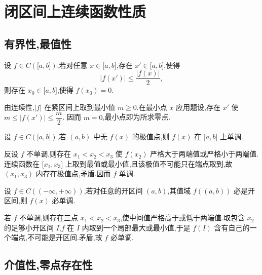 \newpage

\section{闭区间上连续函数性质}


\subsection{有界性,最值性}

\begin{example}
    设 $f\in C(\lbrack a,b\rbrack)$,若对任意 $x\in\lbrack a,b\rbrack$,存在 $x'\in\lbrack a,b\rbrack$,使得
    \[
        |f(x')|\leq\dfrac{|f(x)|}{2},
    \]
    则存在 $x_0\in\lbrack a,b\rbrack$,使得 $f(x_0)=0$.
\end{example}
\exampleblank

\begin{solution}
    由连续性,$|f|$ 在紧区间上取到最小值 $m\geq0$.在最小点 $x$ 应用题设,存在 $x'$ 使 $m\leq |f(x')|\leq\dfrac{m}{2}$.
    因而 $m=0$,最小点即为所求零点.
\end{solution}

\begin{example}
    设 $f\in C(\lbrack a,b\rbrack)$,若 $(a,b)$ 中无 $f(x)$ 的极值点,则 $f(x)$ 在 $\lbrack a,b\rbrack$ 上单调.
\end{example}
\exampleblank

\begin{solution}
    反设 $f$ 不单调,则存在 $x_1<x_2<x_3$ 使 $f(x_2)$ 严格大于两端值或严格小于两端值.连续函数在 $\lbrack x_1,x_3\rbrack$ 上取到最值或最小值,且该极值不可能只在端点取到,故 $(x_1,x_3)$ 内存在极值点,矛盾.因而 $f$ 单调.
\end{solution}

\begin{example}
    设 $f\in C(( -\infty,+\infty))$,若对任意的开区间 $(a,b)$,其值域 $f((a,b))$ 必是开区间,则 $f(x)$ 必单调.
\end{example}
\exampleblank

\begin{solution}
    若 $f$ 不单调,则存在三点 $x_1<x_2<x_3$,使中间值严格高于或低于两端值.取包含 $x_2$ 的足够小开区间 $I$,$f$ 在 $I$ 内取到一个局部最大或最小值,于是 $f(I)$ 含有自己的一个端点,不可能是开区间.矛盾,故 $f$ 必单调.
\end{solution}



\subsection{介值性,零点存在性}

